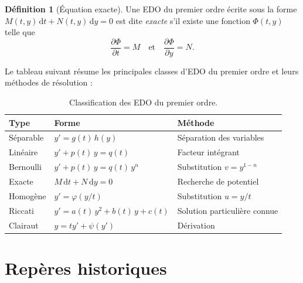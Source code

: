 \documentclass[12pt,a4paper,openany]{book}
\theoremstyle{definition}
\newtheorem{definition}{Définition}[chapter]
\theoremstyle{plain}
\theoremstyle{remark}
\newcommand{\dd}{\mathrm{d}}
\begin{document}
\begin{definition}[Équation exacte]
\label{def:exacte}
Une EDO du premier ordre écrite sous la forme $M(t,y)\,\dd t + N(t,y)\,\dd y = 0$ est dite \emph{exacte} s'il existe une fonction $\Phi(t,y)$ telle que
\[
\frac{\partial \Phi}{\partial t} = M \quad \text{et} \quad \frac{\partial \Phi}{\partial y} = N.
\]
\end{definition}

\medskip

Le tableau suivant résume les principales classes d'EDO du premier ordre et leurs méthodes de résolution :

\begin{table}[ht]
\centering
\caption{Classification des EDO du premier ordre.}
\label{tab:classification-edo1}
\begin{tabular}{@{}lll@{}}
\toprule
\textbf{Type} & \textbf{Forme} & \textbf{Méthode} \\
\midrule
Séparable & $y' = g(t)\,h(y)$ & Séparation des variables \\
Linéaire & $y' + p(t)\,y = q(t)$ & Facteur intégrant \\
Bernoulli & $y' + p(t)\,y = q(t)\,y^n$ & Substitution $v = y^{1-n}$ \\
Exacte & $M\,\dd t + N\,\dd y = 0$ & Recherche de potentiel \\
Homogène & $y' = \varphi(y/t)$ & Substitution $u = y/t$ \\
Riccati & $y' = a(t)\,y^2 + b(t)\,y + c(t)$ & Solution particulière connue \\
Clairaut & $y = ty' + \psi(y')$ & Dérivation \\
\bottomrule
\end{tabular}
\end{table}

\section{Repères historiques}
\label{sec:historique}
\end{document}
